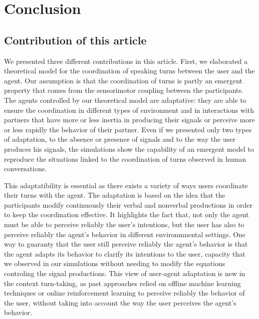 \section{Conclusion}

\subsection{Contribution of this article}

We presented three different contributions in this article. First, we elaborated a theoretical model for the coordination of speaking turns between the user and the agent. Our assumption is that the coordination of turns is partly an emergent property that comes from the sensorimotor coupling between the participants. 
The agents controlled by our theoretical model are adaptative: they are able to ensure the coordination in different types of environment and in interactions with partners that have more or less inertia in producing their signals or perceive more or less rapidly the behavior of their partner. Even if we presented only two types of adaptation, to the absence or presence of signals and to the way the user produces his signals, the simulations show the capability of an emergent model to reproduce the situations linked to the coordination of turns observed in human conversations.

This adaptatibility is essential as there exists a variety of ways users coordinate their turns with the agent. The adaptation is based on the idea that the participants modify continuously their verbal and nonverbal productions in order to keep the coordination effective. It highlights the fact that, not only the agent must be able to perceive reliably the user's intentions, but the user has also to perceive reliably the agent's behavior in different environmnental settings. One way to guaranty that the user still perceive reliably the agent's behavior is that the agent adapts its behavior to clarify its intentions to the user, capacity that we observed in our simulations without needing to modify the equations controling the signal productions. This view of user-agent adaptation is new in the context turn-taking, as past approaches relied on offline machine learning techniques or online reinforcement learning to perceive reliably the behavior of the user, without taking into account the way the user perceives the agent's behavior. 

